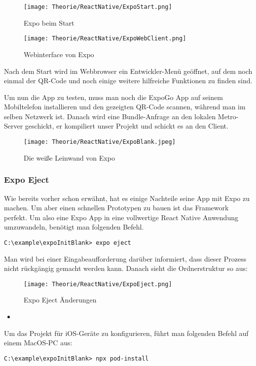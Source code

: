 \begin{figure}[H]
  \begin{center}
    \texttt{[image: Theorie/ReactNative/ExpoStart.png]}
    \caption{Expo beim Start}
  \end{center}
\end{figure}

\begin{figure}[H]
  \begin{center}
    \texttt{[image: Theorie/ReactNative/ExpoWebClient.png]}
    \caption{Webinterface von Expo}
  \end{center}
\end{figure}

Nach dem Start wird im Webbrowser ein Entwickler-Menü geöffnet, auf dem noch einmal der QR-Code
und noch einige weitere hilfreiche Funktionen zu finden sind.

Um nun die App zu testen, muss man noch die ExpoGo App auf seinem Mobiltelefon installieren und den
gezeigten QR-Code scannen, während man im selben Netzwerk ist. Danach wird eine Bundle-Anfrage an
den lokalen Metro-Server geschickt, er kompiliert unser Projekt und schickt es an den Client.

\begin{figure}[H]
  \begin{center}
    \texttt{[image: Theorie/ReactNative/ExpoBlank.jpeg]}
    \caption{Die weiße Leinwand von Expo}
  \end{center}
\end{figure}

\subsubsection{Expo Eject}
Wie bereits vorher schon erwähnt, hat es einige Nachteile seine App mit Expo zu machen. Um aber
einen schnellen Prototypen zu bauen ist das Framework perfekt. Um also eine Expo App in eine
vollwertige React Native Anwendung umzuwandeln, benötigt man folgenden Befehl.

\begin{lstlisting}
C:\example\expoInitBlank> expo eject
\end{lstlisting}

Man wird bei einer Eingabeaufforderung darüber informiert, dass dieser Prozess nicht rückgängig
gemacht werden kann. Danach sieht die Ordnerstruktur so aus:

\begin{figure}[H]
  \begin{center}
    \texttt{[image: Theorie/ReactNative/ExpoEject.png]}
    \caption{Expo Eject Änderungen}
  \end{center}
\end{figure}

\begin{itemize}
  \item 
\end{itemize}

Um das Projekt für iOS-Geräte zu konfigurieren, führt man folgenden Befehl auf einem MacOS-PC aus:

\begin{lstlisting}
C:\example\expoInitBlank> npx pod-install
\end{lstlisting}

